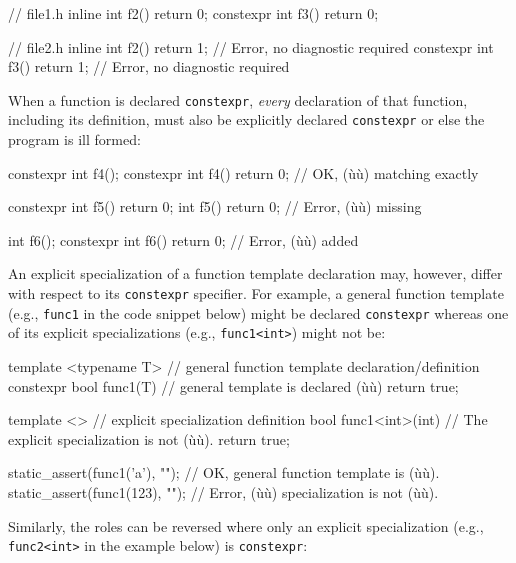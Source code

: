 \begin{emcppslisting}
// file1.h
          inline int f2() { return 0; }
       constexpr int f3() { return 0; }

// file2.h
          inline int f2() { return 1; }  // Error, no diagnostic required
       constexpr int f3() { return 1; }  // Error, no diagnostic required
\end{emcppslisting}
    

\noindent When a function is declared \lstinline!constexpr!, \emph{every} declaration
of that function, including its definition, must also be explicitly
declared \lstinline!constexpr! or else the program is ill formed:

\begin{emcppslisting}
constexpr int f4();
constexpr int f4() { return 0; }  // OK, (ù{}ù) matching exactly

constexpr int f5() { return 0; }
          int f5() { return 0; }  // Error, (ù{}ù) missing

          int f6();
constexpr int f6() { return 0; }  // Error, (ù{}ù) added
\end{emcppslisting}
    

\noindent An explicit specialization of a function template declaration may,
however, differ with respect to its \lstinline!constexpr! specifier. For
example, a general function template (e.g., \lstinline!func1! in the code
snippet below) might be declared \lstinline!constexpr! whereas one of its
explicit specializations (e.g., \lstinline!func1<int>!) might not be:

\begin{emcppslisting}
template <typename T>    // general function template declaration/definition
constexpr bool func1(T)  // general template is declared (ù{}ù)
{
    return true;
}

template <>              // explicit specialization definition
bool func1<int>(int)     // The explicit specialization is not (ù{}ù).
{
    return true;
}

static_assert(func1('a'), "");  // OK, general function template is (ù{}ù).
static_assert(func1(123), "");  // Error, (ù{}ù) specialization is not (ù{}ù).
\end{emcppslisting}
    

\noindent Similarly, the roles can be reversed where only an explicit
specialization (e.g., \lstinline!func2<int>! in the example below) is
\lstinline!constexpr!:

